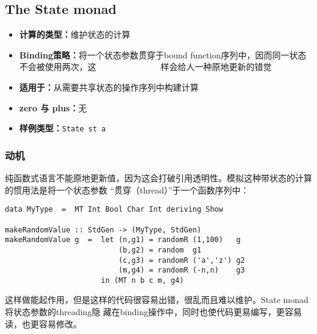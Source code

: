 \subsection{The State monad}
\begin{itemize}[leftmargin=*,topsep=0pt,itemsep=0pt]
\item \textbf{计算的类型：}维护状态的计算
\item \textbf{Binding策略：}将一个状态参数贯穿于bound function序列中，因而同一状态不会被使用两次，这
                            $\textrm{ }\quad\quad\quad\quad\quad\;\;\quad$样会给人一种原地更新的错觉
\item \textbf{适用于：}从需要共享状态的操作序列中构建计算
\item \textbf{zero 与 plus：}无
\item \textbf{样例类型：}\texttt{State st a}
\end{itemize}

\vspace{-1em}
\subsubsection{动机}
\vspace{-0.5em}
\indent{}纯函数式语言不能原地更新值，因为这会打破引用透明性。模拟这种带状态的计算的惯用法是将一个状态参数
“贯穿（thread）”于一个函数序列中：
\vspace{-0.8em}
\begin{verbatim}
data MyType  =  MT Int Bool Char Int deriving Show

makeRandomValue :: StdGen -> (MyType, StdGen)
makeRandomValue g  =  let (n,g1) = randomR (1,100)   g
                          (b,g2) = random  g1
                          (c,g3) = randomR ('a','z') g2
                          (m,g4) = randomR (-n,n)    g3
                      in (MT n b c m, g4)
\end{verbatim}
\noindent{}这样做能起作用，但是这样的代码很容易出错，很乱而且难以维护。State monad将状态参数的threading隐
藏在binding操作中，同时也使代码更易编写，更容易读，也更容易修改。

\vspace{-0.8em}
